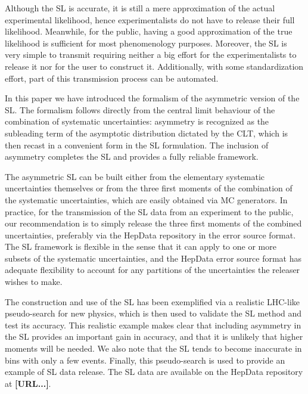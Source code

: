 \documentclass[11pt]{article}
\begin{document}
Although the SL is  accurate, it is still a mere approximation of the actual experimental likelihood, hence experimentalists do not have to release their full likelihood. Meanwhile, for the public, having a good approximation of the true likelihood is sufficient for most phenomenology purposes. 
Moreover, the SL is very simple to transmit requiring neither a big effort for the experimentalists to release it nor for the user to construct it. Additionally, with some standardization effort, part of this transmission process can be automated. 

In this paper we have introduced the formalism of the asymmetric version of the SL. 
The formalism follows directly from the central limit behaviour of the combination of systematic uncertainties: asymmetry is recognized as the subleading term of the asymptotic distribution dictated by the CLT, which is then recast in a convenient form in the SL formulation. 
The inclusion of asymmetry completes the SL and provides a fully reliable framework.

The asymmetric SL can be built either from the elementary systematic uncertainties themselves or from the three first moments  of the combination of the systematic uncertainties, which are easily obtained via MC generators. 
In practice, for the transmission of the SL data from an experiment to the public, our recommendation is to simply release the three first moments of the combined uncertainties, preferably via the HepData repository in the error source format.  The SL framework is flexible in the sense that it can apply to one or more subsets of the systematic uncertainties,  and the HepData error source format  has adequate flexibility to account for any partitions of the uncertainties
the releaser wishes to make.



The construction and use of the SL has been exemplified via  a realistic LHC-like pseudo-search for new physics, which is then used to validate the SL method and test its accuracy. 
This realistic example makes clear that including asymmetry in the SL provides %
an important gain 
in accuracy, and  that it is unlikely that higher moments will be needed. %
We also note that the SL tends to become inaccurate in bins with only a few events. Finally, this pseudo-search is used to provide an example of SL data release.  The SL data are available on the HepData repository at \textbf{[URL...]}.  

\end{document}
